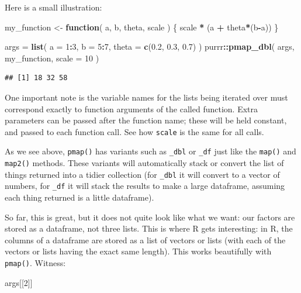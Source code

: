 \documentclass[
]{book}
\newenvironment{Shaded}{\begin{snugshade}}{\end{snugshade}}
\newcommand{\AttributeTok}[1]{\textcolor[rgb]{0.13,0.29,0.53}{#1}}
\newcommand{\ControlFlowTok}[1]{\textcolor[rgb]{0.13,0.29,0.53}{\textbf{#1}}}
\newcommand{\DecValTok}[1]{\textcolor[rgb]{0.00,0.00,0.81}{#1}}
\newcommand{\FloatTok}[1]{\textcolor[rgb]{0.00,0.00,0.81}{#1}}
\newcommand{\FunctionTok}[1]{\textcolor[rgb]{0.13,0.29,0.53}{\textbf{#1}}}
\newcommand{\NormalTok}[1]{#1}
\newcommand{\OtherTok}[1]{\textcolor[rgb]{0.56,0.35,0.01}{#1}}
\newcommand{\SpecialCharTok}[1]{\textcolor[rgb]{0.81,0.36,0.00}{\textbf{#1}}}
\begin{document}
Here is a small illustration:

\begin{Shaded}
\begin{Highlighting}[]
\NormalTok{my\_function }\OtherTok{\textless{}{-}} \ControlFlowTok{function}\NormalTok{( a, b, theta, scale ) \{}
\NormalTok{    scale }\SpecialCharTok{*}\NormalTok{ (a }\SpecialCharTok{+}\NormalTok{ theta}\SpecialCharTok{*}\NormalTok{(b}\SpecialCharTok{{-}}\NormalTok{a))}
\NormalTok{\}}

\NormalTok{args }\OtherTok{=} \FunctionTok{list}\NormalTok{( }\AttributeTok{a =} \DecValTok{1}\SpecialCharTok{:}\DecValTok{3}\NormalTok{, }
             \AttributeTok{b =} \DecValTok{5}\SpecialCharTok{:}\DecValTok{7}\NormalTok{, }
             \AttributeTok{theta =} \FunctionTok{c}\NormalTok{(}\FloatTok{0.2}\NormalTok{, }\FloatTok{0.3}\NormalTok{, }\FloatTok{0.7}\NormalTok{) )}
\NormalTok{purrr}\SpecialCharTok{::}\FunctionTok{pmap\_dbl}\NormalTok{(  args, my\_function, }\AttributeTok{scale =} \DecValTok{10}\NormalTok{ )}
\end{Highlighting}
\end{Shaded}

\begin{verbatim}
## [1] 18 32 58
\end{verbatim}

One important note is the variable names for the lists being iterated over must correspond exactly to function arguments of the called function.
Extra parameters can be passed after the function name; these will be held constant, and passed to each function call.
See how \texttt{scale} is the same for all calls.

As we see above, \texttt{pmap()} has variants such as \texttt{\_dbl} or \texttt{\_df} just like the \texttt{map()} and \texttt{map2()} methods.
These variants will automatically stack or convert the list of things returned into a tidier collection (for \texttt{\_dbl} it will convert to a vector of numbers, for \texttt{\_df} it will stack the results to make a large dataframe, assuming each thing returned is a little dataframe).

So far, this is great, but it does not quite look like what we want: our factors are stored as a dataframe, not three lists.
This is where R gets interesting: in R, the columns of a dataframe are stored as a list of vectors or lists (with each of the vectors or lists having the exact same length).
This works beautifully with \texttt{pmap()}.
Witness:

\begin{Shaded}
\begin{Highlighting}[]
\NormalTok{args[[}\DecValTok{2}\NormalTok{]]}
\end{Highlighting}
\end{Shaded}
\end{document}
